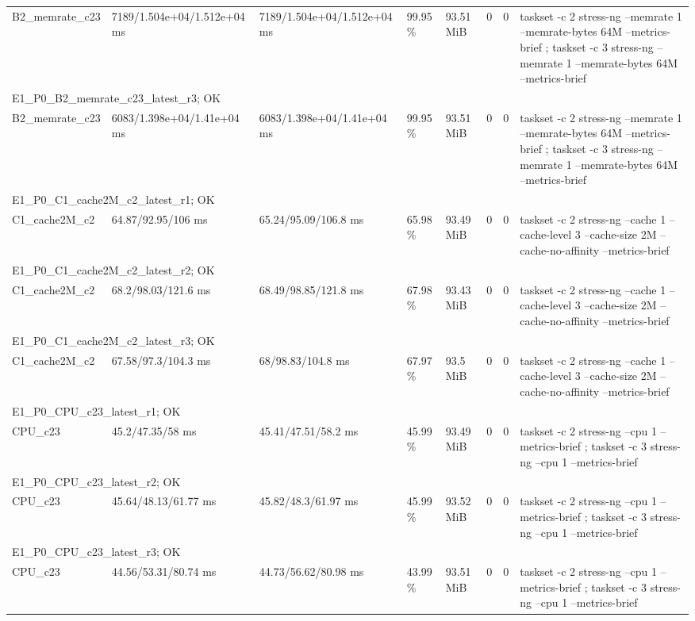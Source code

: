 \begin{tabular}{llllllll}
B2\_memrate\_c23 & 7189/1.504e+04/1.512e+04 ms & 7189/1.504e+04/1.512e+04 ms & 99.95 \% & 93.51 MiB & 0 & 0 & taskset -c 2 stress-ng --memrate 1 --memrate-bytes 64M --metrics-brief ; taskset -c 3 stress-ng --memrate 1 --memrate-bytes 64M --metrics-brief \\
\multicolumn{8}{l}{E1\_P0\_B2\_memrate\_c23\_latest\_r3; OK} \\
B2\_memrate\_c23 & 6083/1.398e+04/1.41e+04 ms & 6083/1.398e+04/1.41e+04 ms & 99.95 \% & 93.51 MiB & 0 & 0 & taskset -c 2 stress-ng --memrate 1 --memrate-bytes 64M --metrics-brief ; taskset -c 3 stress-ng --memrate 1 --memrate-bytes 64M --metrics-brief \\
\multicolumn{8}{l}{E1\_P0\_C1\_cache2M\_c2\_latest\_r1; OK} \\
C1\_cache2M\_c2 & 64.87/92.95/106 ms & 65.24/95.09/106.8 ms & 65.98 \% & 93.49 MiB & 0 & 0 & taskset -c 2 stress-ng --cache 1 --cache-level 3 --cache-size 2M --cache-no-affinity --metrics-brief \\
\multicolumn{8}{l}{E1\_P0\_C1\_cache2M\_c2\_latest\_r2; OK} \\
C1\_cache2M\_c2 & 68.2/98.03/121.6 ms & 68.49/98.85/121.8 ms & 67.98 \% & 93.43 MiB & 0 & 0 & taskset -c 2 stress-ng --cache 1 --cache-level 3 --cache-size 2M --cache-no-affinity --metrics-brief \\
\multicolumn{8}{l}{E1\_P0\_C1\_cache2M\_c2\_latest\_r3; OK} \\
C1\_cache2M\_c2 & 67.58/97.3/104.3 ms & 68/98.83/104.8 ms & 67.97 \% & 93.5 MiB & 0 & 0 & taskset -c 2 stress-ng --cache 1 --cache-level 3 --cache-size 2M --cache-no-affinity --metrics-brief \\
\multicolumn{8}{l}{E1\_P0\_CPU\_c23\_latest\_r1; OK} \\
CPU\_c23 & 45.2/47.35/58 ms & 45.41/47.51/58.2 ms & 45.99 \% & 93.49 MiB & 0 & 0 & taskset -c 2 stress-ng --cpu 1 --metrics-brief ; taskset -c 3 stress-ng --cpu 1 --metrics-brief \\
\multicolumn{8}{l}{E1\_P0\_CPU\_c23\_latest\_r2; OK} \\
CPU\_c23 & 45.64/48.13/61.77 ms & 45.82/48.3/61.97 ms & 45.99 \% & 93.52 MiB & 0 & 0 & taskset -c 2 stress-ng --cpu 1 --metrics-brief ; taskset -c 3 stress-ng --cpu 1 --metrics-brief \\
\multicolumn{8}{l}{E1\_P0\_CPU\_c23\_latest\_r3; OK} \\
CPU\_c23 & 44.56/53.31/80.74 ms & 44.73/56.62/80.98 ms & 43.99 \% & 93.51 MiB & 0 & 0 & taskset -c 2 stress-ng --cpu 1 --metrics-brief ; taskset -c 3 stress-ng --cpu 1 --metrics-brief \\
\bottomrule
\end{tabular}
